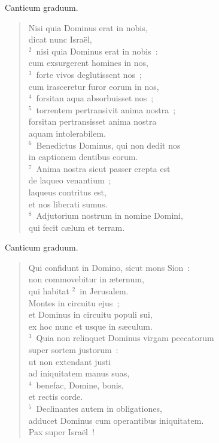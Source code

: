 \bchapter
\lettrine[lines=3,image=true,loversize=0.05,lraise=-0.03]{C}{}anticum graduum. \begin{flushleft}\begin{verse}\vspace{6pt}Nisi quia Dominus erat in nobis,\\ dicat nunc Isra\"el,\\
${}^{2}$~nisi quia Dominus erat in nobis~:\\ cum exsurgerent homines in nos,\\
${}^{3}$~forte vivos deglutissent nos~;\\ cum irasceretur furor eorum in nos,\\
${}^{4}$~forsitan aqua absorbuisset nos~;\\
${}^{5}$~torrentem pertransivit anima nostra~;\\ forsitan pertransisset anima nostra\\ aquam intolerabilem.\\
${}^{6}$~Benedictus Dominus, qui non dedit nos\\ in captionem dentibus eorum.\\
${}^{7}$~Anima nostra sicut passer erepta est\\ de laqueo venantium~;\\ laqueus contritus est,\\ et nos liberati sumus.\\
${}^{8}$~Adjutorium nostrum in nomine Domini,\\ qui fecit c\ae lum et terram.\end{verse}\end{flushleft}



\bchapter
\lettrine[lines=3,image=true,loversize=0.05,lraise=-0.03]{C}{}anticum graduum. \begin{flushleft}\begin{verse}\vspace{6pt}Qui confidunt in Domino, sicut mons Sion~:\\ non commovebitur in \ae ternum,\\ qui habitat
${}^{2}$~in Jerusalem.\\ Montes in circuitu ejus~;\\ et Dominus in circuitu populi sui,\\ ex hoc nunc et usque in s\ae culum.\\
${}^{3}$~Quia non relinquet Dominus virgam peccatorum\\ super sortem justorum~:\\ ut non extendant justi\\ ad iniquitatem manus suas,\\
${}^{4}$~benefac, Domine, bonis,\\ et rectis corde.\\
${}^{5}$~Declinantes autem in obligationes,\\ adducet Dominus cum operantibus iniquitatem.\\ Pax super Isra\"el~!\end{verse}\end{flushleft}



